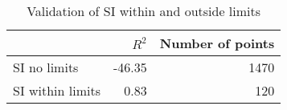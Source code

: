 
\begin{table}[H]
    \centering
    \caption{Validation of SI within and outside limits}
   \begin{tabular}{lrr}
\toprule
{} &  $R^2$ &  Number of points \\
\midrule
SI no limits     & -46.35 &              1470 \\
SI within limits &   0.83 &               120 \\
\bottomrule
\end{tabular}

    \label{tab:si_validation}
\end{table}
    